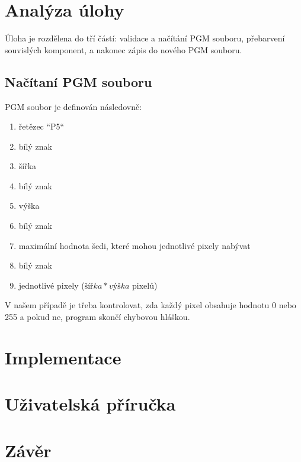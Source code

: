 \chapter{Analýza úlohy}
Úloha je rozdělena do tří částí: validace a načítání PGM souboru, přebarvení
souvislých komponent, a nakonec zápis do nového PGM souboru.
\section{Načítaní PGM souboru}
PGM soubor je definován následovně:
\begin{enumerate}
	\item řetězec ``P5``
	\item bílý znak
	\item šířka
	\item bílý znak
	\item výška
	\item bílý znak
	\item maximální hodnota šedi, které mohou jednotlivé pixely nabývat
	\item bílý znak
	\item jednotlivé pixely ($šířka * výška$ pixelů)
\end{enumerate}

V našem případě je třeba kontrolovat, zda každý pixel obsahuje hodnotu 0 nebo
255 a pokud ne, program skončí chybovou hláškou.

\chapter{Implementace}

\chapter{Uživatelská příručka}

\chapter{Závěr}

